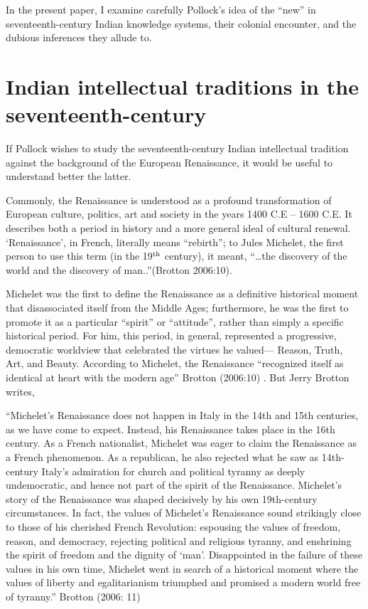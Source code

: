 In the present paper, I examine carefully Pollock’s idea of the “new” in seventeenth-century Indian knowledge systems, their colonial encounter, and the dubious inferences they allude to.  

\section{Indian intellectual traditions in the seventeenth-century}

If Pollock wishes to study the seventeenth-century Indian intellectual tradition against the background of the European Renaissance, it would be useful to understand better the latter. 

Commonly, the Renaissance is understood as a profound transformation of European culture, politics, art and society in the years 1400 C.E – 1600 C.E.  It describes both a period in history and a more general ideal of cultural renewal. ‘Renaissance’, in French, literally means “rebirth”; to Jules Michelet, the first person to use this term (in the 19$^{\rm th}$ century), it meant, “…the discovery of the world and the discovery of man..”(Brotton 2006:10). 
\begin{myquote}
Michelet was the first to define the Renaissance as a definitive historical moment that disassociated itself from the Middle Ages; furthermore, he was the first to promote it as a particular “spirit” or “attitude”, rather than simply a specific historical period. For him, this period, in general, represented a progressive, democratic worldview that celebrated the virtues he valued— Reason, Truth, Art, and Beauty. According to Michelet, the Renaissance “recognized itself as identical at heart with the modern age” Brotton (2006:10) . But Jerry Brotton writes, 

“Michelet’s Renaissance does not happen in Italy in the 14th and 15th centuries, as we have come to expect. Instead, his Renaissance takes place in the 16th century. As a French nationalist, Michelet was eager to claim the Renaissance as a French phenomenon. As a republican, he also rejected what he saw as 14th-century Italy’s admiration for church and political tyranny as deeply undemocratic, and hence not part of the spirit of the Renaissance. Michelet’s story of the Renaissance was shaped decisively by his own 19th-century circumstances. In fact, the values of Michelet’s Renaissance sound strikingly close to those of his cherished French Revolution: espousing the values of freedom, reason, and democracy, rejecting political and religious tyranny, and enshrining the spirit of freedom and the dignity of ‘man’. Disappointed in the failure of these values in his own time, Michelet went in search of a historical moment where the values of liberty and egalitarianism triumphed and promised a modern world free of tyranny.”	\hfill{Brotton (2006: 11)}
\end{myquote}

